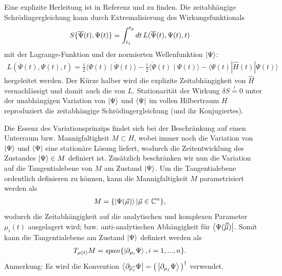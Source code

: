 Eine explizite Herleitung ist in Referenz \cite{noauthor_2008-dn} und \cite{Haegeman_2011} zu finden.
Die zeitabhängige Schrödingergleichung kann durch Extremalisierung des Wirkungsfunktionals
\begin{align}\label{Wirkungsfunktional}
    S\{\overline{\Psi}(t),\Psi(t)\} &=  \int_{t_1}^{t_2}dt \thinspace L(\overline{\Psi}(t),\Psi(t),t)
\end{align}
mit der Lagrange-Funktion und der normierten Wellenfunktion $\ket{\Psi}$:
\begin{align}\label{Lagrange}
    L\left(\overline{\Psi}(t), \Psi(t), t\right)=\frac{i}{2}\langle\Psi(t) \mid \dot{\Psi}(t)\rangle-\frac{i}{2}\langle\dot{\Psi}(t) \mid \Psi(t)\rangle-\langle\Psi(t)|\hat{H}(t)| \Psi(t)\rangle
\end{align}
hergeleitet werden. Der Kürze halber wird die explizite Zeitabhängigkeit von $\hat{H}$ vernachlässigt und damit auch die von $L$. Stationarität der Wirkung 
$\delta S \overset{!}{=} 0$ unter der unabhängigen Variation von $\ket{\Psi}$ und $\bra{\Psi}$ im vollen Hilbertraum $H$ reproduziert die zeitabhängige 
Schrödingergleichung (und ihr Konjugiertes).\

Die Essenz des Variationsprinzips findet sich bei der Beschränkung auf einen Unterraum bzw. Mannigfaltigkeit $M\subset H$, wobei 
immer noch die Variation von $\ket{\Psi}$ und $\bra{\Psi}$ eine stationäre Lösung liefert, wodurch die Zeitentwicklung des Zustandes $\ket{\Psi} \in M$
definiert ist. Zusätzlich beschränken wir nun die Variation auf die Tangentialebene von $M$ am Zustand $\ket{\Psi}$. Um die Tangentialebene ordentlich 
definieren zu können, kann die Mannigfaltigkeit $M$ parametrisiert werden als   
\begin{align}
    M &= \{\ket{\Psi(\vec{\mu})}|\vec{\mu}\in \mathbb{C}^n\},
\end{align}
wodurch die Zeitabhängigkeit auf die analytischen und komplexen Parameter $\mu_i(t)$ ausgelagert wird; bzw. anti-analytischen Abhängigkeit für 
$\bra{\Psi(\vec{\overline{\mu}})}$. Somit kann die Tangentialebene am Zustand $\ket{\Psi}$ definiert werden als  
\begin{align}
    T_{\mu(t)}M &= span\{\ket{\partial_{\mu_i}\Psi}, i = 1,...,n\}.
\end{align}
Anmerkung: Es wird die Konvention $\bra{\partial_{\overline{\mu_j}}\Psi} = \left(\thinspace\ket{\partial_{\mu_j}\Psi}\thinspace\right)^\dagger$ verwendet.

